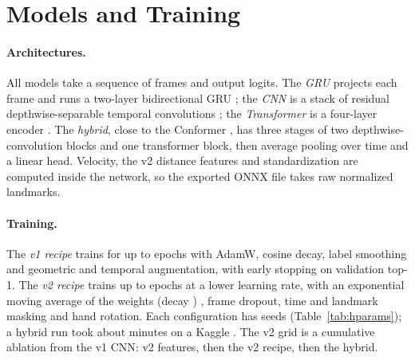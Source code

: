 \section{Models and Training}
\label{sec:models}

\paragraph{Architectures.}
All models take a sequence of  frames and output  logits. The
\emph{GRU} projects each frame and runs a two-layer bidirectional GRU \citep{cho2014gru}; the
\emph{CNN} is a stack of residual depthwise-separable temporal convolutions
\citep{howard2017mobilenets,bai2018tcn}; the \emph{Transformer} is a four-layer encoder
\citep{vaswani2017attention}. The \emph{hybrid}, close to the Conformer \citep{gulati2020conformer},
has three stages of two depthwise-convolution blocks and one transformer block, then average
pooling over time and a linear head. Velocity, the v2 distance features and standardization are
computed inside the network, so the exported ONNX file takes raw normalized landmarks.

\paragraph{Training.}
The \emph{v1 recipe} trains for up to  epochs with AdamW, cosine decay, label
smoothing and geometric and temporal augmentation, with early stopping on validation top-1. The
\emph{v2 recipe} trains up to  epochs at a lower learning rate, with an exponential
moving average of the weights (decay ) \citep{polyak1992averaging}, frame dropout,
time and landmark masking and hand rotation. Each configuration has  seeds
(Table~\ref{tab:hparams}); a hybrid run took about  minutes on a Kaggle .
The v2 grid is a cumulative ablation from the v1 CNN: v2 features, then the v2 recipe, then the
hybrid.

